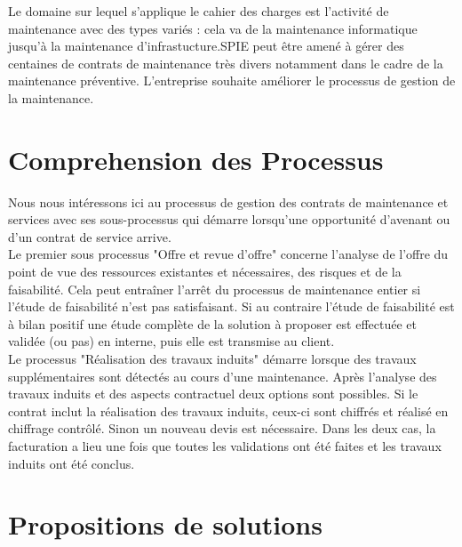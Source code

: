 \documentclass[]{scrartcl}
\begin{document}
Le domaine sur lequel s'applique le cahier des charges est l'activité de maintenance avec des types variés : cela va de la maintenance informatique jusqu'à la maintenance d'infrastucture.SPIE peut être amené à gérer des centaines de contrats de maintenance très divers notamment dans le cadre de la maintenance préventive. L'entreprise souhaite améliorer le processus de gestion de la maintenance.  


\section{Comprehension des Processus}
Nous nous intéressons ici au processus de gestion des contrats de maintenance et services avec ses sous-processus qui démarre lorsqu'une opportunité d'avenant ou d'un contrat de service arrive.\\

Le premier sous processus "Offre et revue d'offre" concerne l'analyse de l'offre du point de vue des ressources existantes et nécessaires, des risques et de la faisabilité. Cela peut entraîner l'arrêt du processus de maintenance entier si l'étude de faisabilité n'est pas satisfaisant. Si au contraire l'étude de faisabilité est à bilan positif une étude complète de la solution à proposer est effectuée et validée (ou pas) en interne, puis elle est transmise au client.\\

Le processus "Réalisation des travaux induits" démarre lorsque des travaux supplémentaires sont détectés au cours d'une maintenance. Après l'analyse des travaux induits et des aspects contractuel deux options sont possibles. Si le contrat inclut la réalisation des travaux induits, ceux-ci sont chiffrés et réalisé en chiffrage contrôlé. Sinon un nouveau devis est nécessaire. Dans les deux cas, la facturation a lieu une fois que toutes les validations ont été faites et les travaux induits ont été conclus.


\section{Propositions de solutions}
\end{document}

